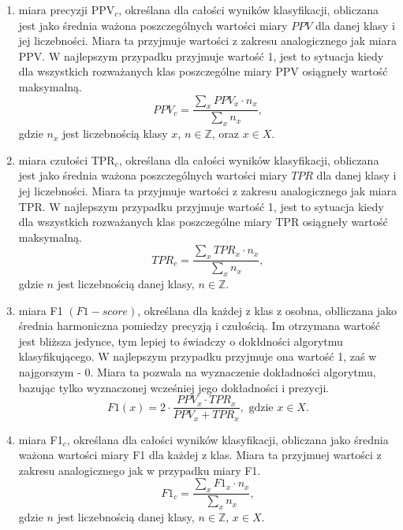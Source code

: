 \documentclass{classrep}
\begin{document}
\begin{enumerate}
\item miara precyzji PPV$_c$, określana dla całości wyników klasyfikacji, obliczana jest jako średnia ważona poszczególnych wartości miary \(PPV\) dla danej klasy i jej liczebności.
Miara ta przyjmuje wartości z zakresu analogicznego jak miara PPV. W najlepszym przypadku przyjmuje wartość 1, jest to sytuacja kiedy dla wszystkich rozważanych klas poszczególne miary PPV osiągneły wartość maksymalną.
  \begin{equation}
    PPV_c = \frac{\sum_{x} PPV_x \cdot n_{x}}{\sum_{x} n_{x}},
  \end{equation}
    gdzie $n_x$ jest liczebnością klasy $x$, $n\in \mathbb{Z} $, oraz $x\in X$.\\

\item miara czułości TPR$_c$, określana dla całości wyników klasyfikacji, obliczana jest jako średnia ważona poszczególnych wartości miary \(TPR\) dla danej klasy i jej liczebności.
Miara ta przyjmuje wartości z zakresu analogicznego jak miara TPR. W najlepszym przypadku przyjmuje wartość 1, jest to sytuacja kiedy dla wszystkich rozważanych klas poszczególne miary TPR osiągneły wartość maksymalną.
  \begin{equation}
    TPR_c = \frac{\sum_{x} TPR_x \cdot n_{x}}{\sum_{x} n_{x}}, 
  \end{equation}
gdzie $n$ jest liczebnością danej klasy, $n\in \mathbb{Z}$.\\

\item miara F1 \((F1-score)\), określana dla każdej z klas z osobna, oblliczana jako średnia harmoniczna pomiedzy precyzją i czułością.
Im otrzymana wartość jest bliższa jedynce, tym lepiej to świadczy o dokłdności algorytmu klasyfikującego. W najlepszym przypadku przyjmuje ona wartość 1, zaś w najgorszym - 0.
Miara ta pozwala na wyznaczenie dokładności algorytmu, bazując tylko wyznaczonej wcześniej jego dokładności i prezycji.
  \begin{equation}
    F1(x) = 2 \cdot \frac{PPV_{x} \cdot TPR_{x}} {PPV_{x} + TPR_{x}}, \text{ gdzie } x\in X.
  \end{equation}

\item miara F1$_c$, określana dla całości wyników klasyfikacji, obliczana jako średnia ważona wartości miary F1 dla każdej z klas. Miara ta przyjmuej wartości z zakresu analogicznego jak w przypadku miary F1.
\begin{equation}
  F1_c = \frac{\sum_{x} F1_x \cdot n_{x}}{\sum_{x} n_{x}}, 
\end{equation}
  gdzie $n$ jest liczebnością danej klasy, $n\in \mathbb{Z}$, $x\in X$.
\end{enumerate}
\end{document}
